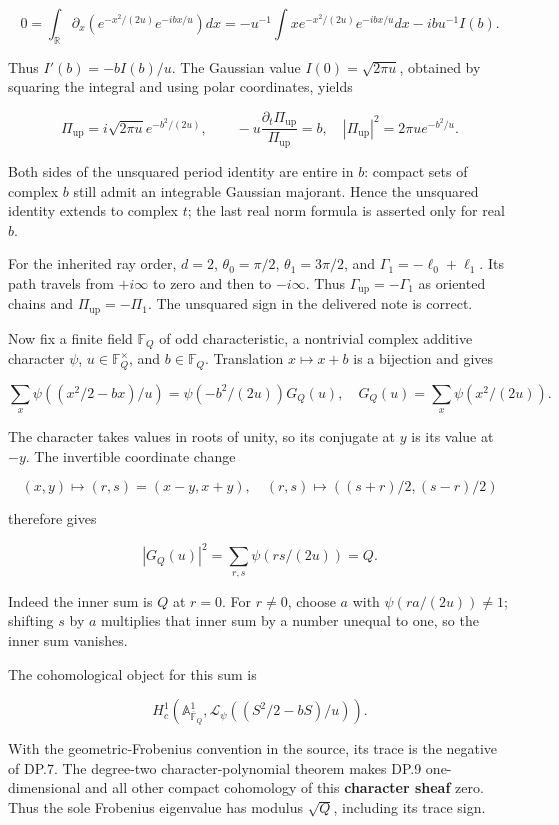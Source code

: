\documentclass{article}
\begin{document}
\[
0=\int_{\mathbb R}\partial_x
       (e^{-x^2/(2u)}e^{-ibx/u})dx
=-u^{-1}\int x e^{-x^2/(2u)}e^{-ibx/u}dx
 -ibu^{-1}I(b).
\]

Thus \(I'(b)=-bI(b)/u\). The Gaussian value \(I(0)=\sqrt{2\pi u}\), obtained by squaring the integral and using polar coordinates, yields

\[
\Pi_{\mathrm{up}}=i\sqrt{2\pi u}
 e^{-b^2/(2u)},\qquad
-u\frac{\partial_t\Pi_{\mathrm{up}}}{\Pi_{\mathrm{up}}}=b,
\quad |\Pi_{\mathrm{up}}|^2=2\pi u e^{-b^2/u}.
\tag{DP.6}
\]

Both sides of the unsquared period identity are entire in \(b\): compact sets of complex \(b\) still admit an integrable Gaussian majorant. Hence the unsquared identity extends to complex \(t\); the last real norm formula is asserted only for real \(b\).

For the inherited ray order, \(d=2\), \(\theta_0=\pi/2\), \(\theta_1=3\pi/2\), and \(\Gamma_1=-\ell_0+\ell_1\). Its path travels from \(+i\infty\) to zero and then to \(-i\infty\). Thus \(\Gamma_{\mathrm{up}}=-\Gamma_1\) as oriented chains and \(\Pi_{\mathrm{up}}=-\Pi_1\). The unsquared sign in the delivered note is correct.

Now fix a finite field \(\mathbb F_Q\) of odd characteristic, a nontrivial complex additive character \(\psi\), \(u\in\mathbb F_Q^\times\), and \(b\in\mathbb F_Q\). Translation \(x\mapsto x+b\) is a bijection and gives

\[
\sum_x\psi((x^2/2-bx)/u)
=\psi(-b^2/(2u))G_Q(u),
\quad G_Q(u)=\sum_x\psi(x^2/(2u)).
\tag{DP.7}
\]

The character takes values in roots of unity, so its conjugate at \(y\) is its value at \(-y\). The invertible coordinate change

\[
(x,y)\mapsto(r,s)=(x-y,x+y),
\quad (r,s)\mapsto((s+r)/2,(s-r)/2)
\]

therefore gives

\[
|G_Q(u)|^2=\sum_{r,s}\psi(rs/(2u))=Q.
\tag{DP.8}
\]

Indeed the inner sum is \(Q\) at \(r=0\). For \(r\ne0\), choose \(a\) with \(\psi(ra/(2u))\ne1\); shifting \(s\) by \(a\) multiplies that inner sum by a number unequal to one, so the inner sum vanishes.

The cohomological object for this sum is

\[
H_c^1(\mathbb A^1_{\overline{\mathbb F}_Q},
 \mathcal L_{\psi}((S^2/2-bS)/u)).
\tag{DP.9}
\]

With the geometric-Frobenius convention in the source, its trace is the negative of DP.7. The degree-two character-polynomial theorem makes DP.9 one-dimensional and all other compact cohomology of this \textbf{character sheaf} zero. Thus the sole Frobenius eigenvalue has modulus \(\sqrt Q\), including its trace sign.
\end{document}
